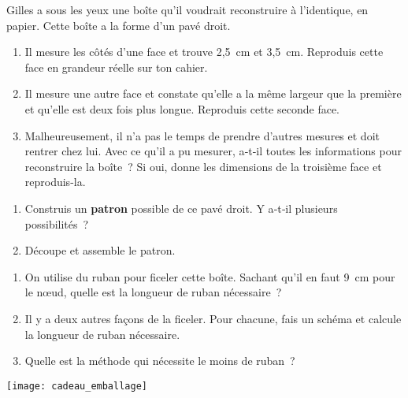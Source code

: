
\begin{activite}

\begin{partie}
Gilles a sous les yeux une boîte qu'il voudrait reconstruire à l'identique, en papier. Cette boîte a la forme d'un pavé droit. 
\begin{enumerate}
 \item Il mesure les côtés d'une face et trouve 2,5 cm et 3,5 cm. Reproduis cette face en grandeur réelle sur ton cahier.
 \item Il mesure une autre face et constate qu'elle a la même largeur que la première et qu'elle est deux fois plus longue. Reproduis cette seconde face.
 \item Malheureusement, il n'a pas le temps de prendre d'autres mesures et doit rentrer chez lui. Avec ce qu'il a pu mesurer, a‑t‑il toutes les informations pour reconstruire la boîte ? Si oui, donne les dimensions de la troisième face et reproduis-la.
 \end{enumerate}
\end{partie}

\begin{partie}
\begin{enumerate}
 \item Construis un \textbf{patron} possible de ce pavé droit. Y a‑t‑il plusieurs possibilités ?
 \item Découpe et assemble le patron.
 \end{enumerate}
\end{partie}

\begin{partie}
\begin{minipage}[c]{0.78\linewidth}
 \begin{enumerate}
  \item On utilise du ruban pour ficeler cette boîte. Sachant qu'il en faut 9 cm pour le nœud, quelle est la longueur de ruban nécessaire ?
  \item Il y a deux autres façons de la ficeler. Pour chacune, fais un schéma et calcule la longueur de ruban nécessaire.
  \item Quelle est la méthode qui nécessite le moins de ruban ?
 \end{enumerate}
\end{minipage} \hfill%
\begin{minipage}[c]{0.18\linewidth}
 \texttt{[image: cadeau\_emballage]}
\end{minipage} \\
\end{partie}

\end{activite}


